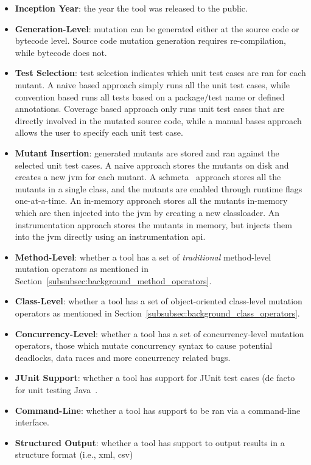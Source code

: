 \begin{itemize}
  \item \textbf{Inception Year}: the year the tool was released to the public.
  \item \textbf{Generation-Level}: mutation can be generated either at the source code or bytecode level. Source code mutation generation requires re-compilation, while bytecode does not.
  \item \textbf{Test Selection}: test selection indicates which unit test cases are ran for each mutant. A naive based approach simply runs all the unit test cases, while convention based runs all tests based on a package/test name or defined annotations. Coverage based approach only runs unit test cases that are directly involved in the mutated source code, while a manual bases approach allows the user to specify each unit test case.
  \item \textbf{Mutant Insertion}: generated mutants are stored and ran against the selected unit test cases. A naive approach stores the mutants on disk and creates a new \gls{jvm} for each mutant. A schmeta~\cite{UOH93} approach stores all the mutants in a single class, and the mutants are enabled through runtime flags one-at-a-time. An in-memory approach stores all the mutants in-memory which are then injected into the \gls{jvm} by creating a new classloader. An instrumentation approach stores the mutants in memory, but injects them into the \gls{jvm} directly using an instrumentation \gls{api}.
  \item \textbf{Method-Level}: whether a tool has a set of \emph{traditional} method-level mutation operators as mentioned in Section~\ref{subsubsec:background_method_operators}.
  \item \textbf{Class-Level}: whether a tool has a set of object-oriented class-level mutation operators as mentioned in Section~\ref{subsubsec:background_class_operators}.
  \item \textbf{Concurrency-Level}: whether a tool has a set of concurrency-level mutation operators, those which mutate concurrency syntax to cause potential deadlocks, data races and more concurrency related bugs.
  \item \textbf{JUnit Support}: whether a tool has support for JUnit test cases (de facto for unit testing Java~\cite{JUnit}.
  \item \textbf{Command-Line}: whether a tool has support to be ran via a command-line interface.
  \item \textbf{Structured Output}: whether a tool has support to output results in a structure format (i.e., \gls{xml}, \gls{csv})

\end{itemize}
